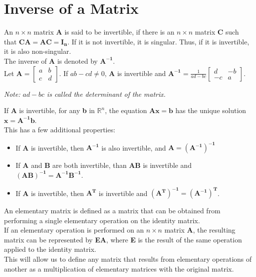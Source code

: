 \documentclass[nobib]{tufte-handout}
\begin{document}
\section{Inverse of a Matrix}
An $n\times n$ matrix \textbf{A} is said to be invertible, if there is an
$n\times n$ matrix \textbf{C} such that $\mathbf{CA=AC=I_n}$. If it is not
invertible, it is singular. Thus, if it is invertible, it is also
non-singular.\\ The inverse of $\mathbf{A}$ is denoted by $\mathbf{A^{-1}}$.\\
Let $\mathbf{A} = \begin{bmatrix}
        a & b \\
        c & d
    \end{bmatrix}$. If $ab-cd \neq 0$, \textbf{A} is invertible and $\mathbf{A^{-1}} = \frac{1}{ad-bc}\begin{bmatrix}
        d  & -b \\
        -c & a
    \end{bmatrix}$.\\
\begin{center}
    \textit{Note: $ad-bc$ is called the determinant of the matrix.}\\
\end{center}
If \textbf{A} is invertible, for any \textbf{b} in $\mathbb{R}^n$, the equation $\mathbf{Ax=b}$ has the unique solution $\mathbf{x=A^{-1}b}$.\\
This has a few additional properties:
\begin{itemize}
    \item If \textbf{A} is invertible, then $\mathbf{A^{-1}}$ is also invertible, and
          $\mathbf{A = (A^{-1})^{-1}}$
    \item If \textbf{A} and \textbf{B} are both invertible, than \textbf{AB} is
          invertible and $\mathbf{(AB)^{-1} = A^{-1}B^{-1}}$.
    \item If \textbf{A} is invertible, then $\mathbf{A^T}$ is invertible and
          $\mathbf{(A^T)^{-1} = (A^{-1})^T}$.
\end{itemize}
An elementary matrix is defined as a matrix that can be obtained from performing a single elementary operation on the identity matrix.\\
If an elementary operation is performed on an $n\times n$ matrix \textbf{A}, the resulting matrix can be represented by \textbf{EA}, where \textbf{E} is the result of the same operation applied to the identity matrix.\\
This will allow us to define any matrix that results from elementary operations of another as a multiplication of elementary matrices with the original matrix.\\
\end{document}
